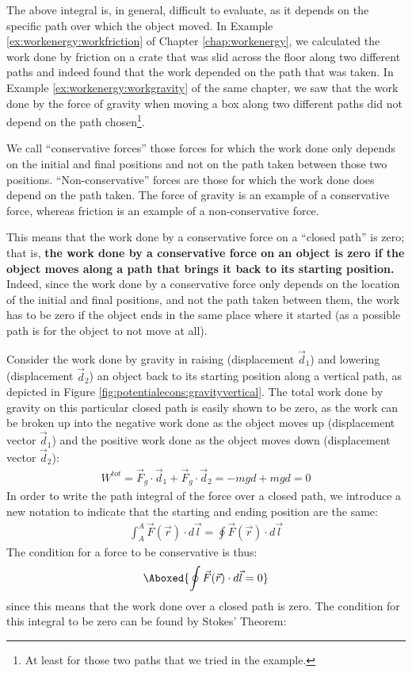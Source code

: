 The above integral is, in general, difficult to evaluate, as it depends on the specific path over which the object moved. In Example \ref{ex:workenergy:workfriction} of Chapter \ref{chap:workenergy}, we calculated the work done by friction on a crate that was slid across the floor along two different paths and indeed found that the work depended on the path that was taken. In Example \ref{ex:workenergy:workgravity} of the same chapter, we saw that the work done by the force of gravity when moving a box along two different paths did not depend on the path chosen\footnote{At least for those two paths that we tried in the example.}.

We call ``conservative forces'' those forces for which the work done only depends on the initial and final positions and not on the path taken between those two positions. ``Non-conservative'' forces are those for which the work done does depend on the path taken. The force of gravity is an example of a conservative force, whereas friction is an example of a non-conservative force.

This means that the work done by a conservative force on a ``closed path'' is zero; that is, \textbf{the work done by a conservative force on an object is zero if the object moves along a path that brings it back to its starting position.}
Indeed, since the work done by a conservative force only depends on the location of the initial and final positions, and not the path taken between them, the work has to be zero if the object ends in the same place where it started (as a possible path is for the object to not move at all).

Consider the work done by gravity in raising (displacement $\vec d_1$) and lowering (displacement $\vec d_2$) an object back to its starting position along a vertical path, as depicted in Figure \ref{fig:potentialecons:gravityvertical}.
The total work done by gravity on this particular closed path is easily shown to be zero, as the work can be broken up into the negative work done as the object moves up (displacement vector $\vec d_1$) and the positive work done as the object moves down (displacement vector $\vec d_2$):
\begin{align*}
W^{tot} = \vec F_g \cdot \vec d_1 + \vec F_g \cdot \vec d_2 = -mgd + mgd = 0 
\end{align*}
In order to write the path integral of the force over a closed path, we introduce a new notation to indicate that the starting and ending position are the same:
\begin{align*}
\int_A^A \vec F(\vec r) \cdot d\vec l = \oint \vec F(\vec r) \cdot d\vec l
\end{align*}
The condition for a force to be conservative is thus:
\begin{align}
\Aboxed{\oint \vec F(\vec r) \cdot d\vec l = 0}
\end{align}
since this means that the work done over a closed path is zero. The condition for this integral to be zero can be found by Stokes' Theorem:

